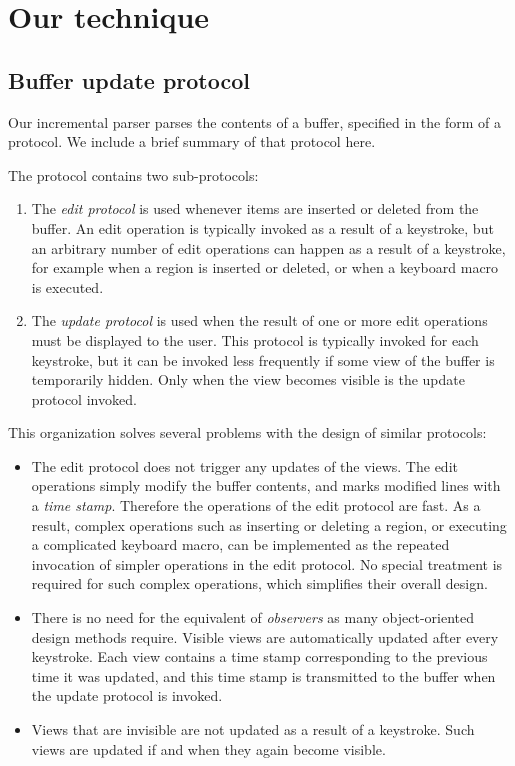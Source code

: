 \section{Our technique}

\subsection{Buffer update protocol}
\label{sec-buffer-update-protocol}

Our incremental parser parses the contents of a buffer, specified in
the form of a \clos{} protocol\cite{Strandh:2016:CPE:3005729.3005732}.
We include a brief summary of that protocol here.

The protocol contains two sub-protocols:

\begin{enumerate}
\item The \emph{edit protocol} is used whenever items are inserted or
  deleted from the buffer.  An edit operation is typically invoked as
  a result of a keystroke, but an arbitrary number of edit operations
  can happen as a result of a keystroke, for example when a region is
  inserted or deleted, or when a keyboard macro is executed.
\item The \emph{update protocol} is used when the result of one or
  more edit operations must be displayed to the user.  This protocol
  is typically invoked for each keystroke, but it can be invoked less
  frequently if some view of the buffer is temporarily hidden.  Only
  when the view becomes visible is the update protocol invoked.
\end{enumerate}

This organization solves several problems with the design of similar
protocols:

\begin{itemize}
\item The edit protocol does not trigger any updates of the views.
  The edit operations simply modify the buffer contents, and marks
  modified lines with a \emph{time stamp}.  Therefore the operations
  of the edit protocol are fast.  As a result, complex operations such
  as inserting or deleting a region, or executing a complicated
  keyboard macro, can be implemented as the repeated invocation of
  simpler operations in the edit protocol.  No special treatment is
  required for such complex operations, which simplifies their overall
  design.
\item There is no need for the equivalent of \emph{observers} as many
  object-oriented design methods require.  Visible views are
  automatically updated after every keystroke.  Each view contains a
  time stamp corresponding to the previous time it was updated, and
  this time stamp is transmitted to the buffer when the update
  protocol is invoked.
\item Views that are invisible are not updated as a result of a
  keystroke.  Such views are updated if and when they again become
  visible.
\end{itemize}

